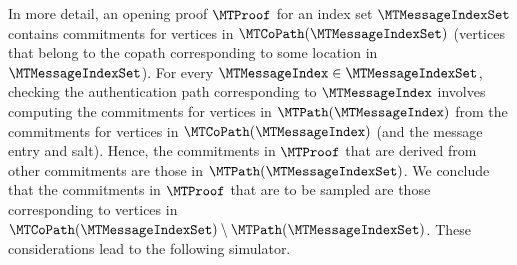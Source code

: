 In more detail, an opening proof $\MTProof$ for an index set $\MTMessageIndexSet$ contains commitments for vertices in $\MTCoPath(\MTMessageIndexSet)$ (vertices that belong to the copath corresponding to some location in $\MTMessageIndexSet$). For every $\MTMessageIndex \in \MTMessageIndexSet$, checking the authentication path corresponding to $\MTMessageIndex$ involves computing the commitments for vertices in $\MTPath(\MTMessageIndex)$ from the commitments for vertices in $\MTCoPath(\MTMessageIndex)$ (and the message entry and salt). Hence, the commitments in $\MTProof$ that are derived from other commitments are those in $\MTPath(\MTMessageIndexSet)$. We conclude that the commitments in $\MTProof$ that are to be sampled are those corresponding to vertices in $\MTCoPath(\MTMessageIndexSet) \setminus \MTPath(\MTMessageIndexSet)$. These considerations lead to the following simulator.

